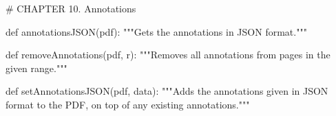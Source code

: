 # CHAPTER 10. Annotations

def annotationsJSON(pdf):
    """Gets the annotations in JSON format."""

def removeAnnotations(pdf, r):
    """Removes all annotations from pages in the given range."""

def setAnnotationsJSON(pdf, data):
    """Adds the annotations given in JSON format to the PDF, on top of any
    existing annotations."""
